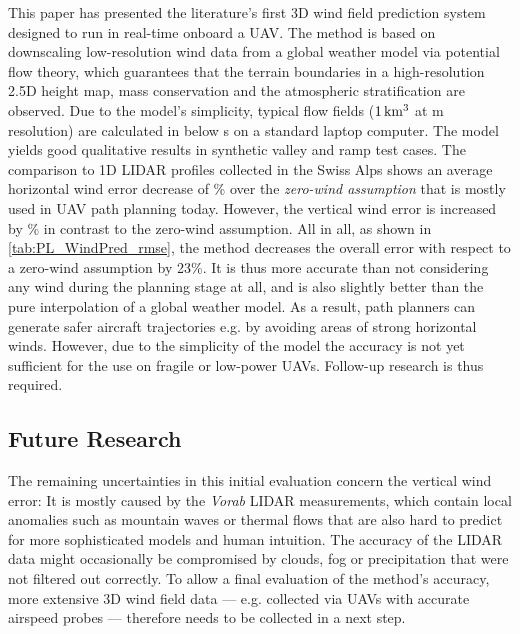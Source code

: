 \documentclass[twocolumn,letterpaper]{IEEEAerospaceCLS}
\begin{document}
This paper has presented the literature's first 3D wind field prediction system designed to run in real-time onboard a UAV. The method is based on downscaling low-resolution wind data from a global weather model via potential flow theory, which guarantees that the terrain boundaries in a high-resolution 2.5D height map, mass conservation and the atmospheric stratification are observed. Due to the model's simplicity, typical flow fields ($\unit[1]{km^3}$ at \unit[25]{m} resolution) are calculated in below \unit[10]{s} on a standard laptop computer. The model yields good qualitative results in synthetic valley and ramp test cases. The comparison to 1D LIDAR profiles collected in the Swiss Alps shows an average horizontal wind error decrease of \unit[41]{\%} over the \emph{zero-wind assumption} that is mostly used in UAV path planning today. However, the vertical wind error is increased by \unit[26]{\%} in contrast to the zero-wind assumption. All in all, as shown in \cref{tab:PL_WindPred_rmse}, the method decreases the overall error with respect to a zero-wind assumption by 23\%. It is thus more accurate than not considering any wind during the planning stage at all, and is also slightly better than the pure interpolation of a global weather model. As a result, path planners can generate safer aircraft trajectories e.g. by avoiding areas of strong horizontal winds. However, due to the simplicity of the model the accuracy is not yet sufficient for the use on fragile or low-power UAVs. Follow-up research is thus required.

\subsection{Future Research}

The remaining uncertainties in this initial evaluation concern the vertical wind error: It is mostly caused by the \emph{Vorab} LIDAR measurements, which contain local anomalies such as mountain waves or thermal flows that are also hard to predict for more sophisticated models and human intuition. The accuracy of the LIDAR data might occasionally be compromised by clouds, fog or precipitation that were not filtered out correctly. To allow a final evaluation of the method's accuracy, more extensive 3D wind field data --- e.g. collected via UAVs with accurate airspeed probes --- therefore needs to be collected in a next step.
\end{document}
